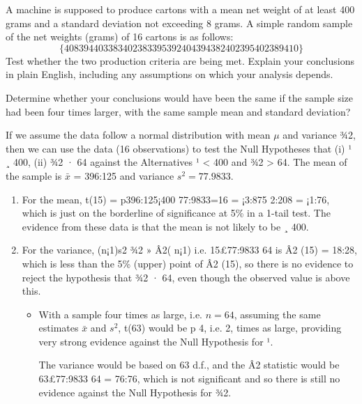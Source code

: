 \documentclass[a4paper,12pt]{article}
\begin{document}
\begin{framed}
A machine is supposed to produce cartons with a mean net weight of at least 400 grams and a standard deviation not exceeding 8 grams.  A simple random sample of the net weights (grams) of 16 cartons is as follows:
\[\{408 394 403 383 402 383 395 392 404 394 382 402 395 402 389 410\}\]
Test whether the two production criteria are being met.  Explain your conclusions in plain English, including any assumptions on which your analysis depends.  

Determine whether your conclusions would have been the same if the sample size had been four times larger, with the same sample mean and standard deviation?


\end{framed}

If we assume the data follow a normal distribution with mean $\mu$ and variance ¾2,
then we can use the data (16 observations) to test the Null Hypotheses that
(i) ¹ ¸ 400, (ii) ¾2 · 64 against the Alternatives ¹ < 400 and ¾2 > 64.
The mean of the sample is $\bar{x}$ = 396:125 and variance $s^2 = 77.9833$.


\begin{enumerate}
    \item For the mean, t(15) = p396:125¡400
77:9833=16
= ¡3:875
2:208 = ¡1:76, which is just on the
borderline of significance at 5\% in a 1-tail test. The evidence from these
data is that the mean is not likely to be ¸ 400.
\item For the variance, (n¡1)s2
¾2 » Â2(
n¡1) i.e. 15£77:9833
64 is Â2
(15) = 18:28, which is
less than the 5\% (upper) point of Â2
(15), so there is no evidence to reject the
hypothesis that ¾2 · 64, even though the observed value is above this.
\begin{itemize}
\item With a sample four times as large, i.e. $n = 64$, assuming the same estimates
$\bar{x}$ and $s^2$, t(63) would be
p
4, i.e. 2, times as large, providing very strong
evidence against the Null Hypothesis for ¹. 

The variance would be based
on 63 d.f., and the Â2 statistic would be 63£77:9833
64 = 76:76, which is not
significant and so there is still no evidence against the Null Hypothesis for
¾2.
\end{itemize}
\end{enumerate}
\end{document}
